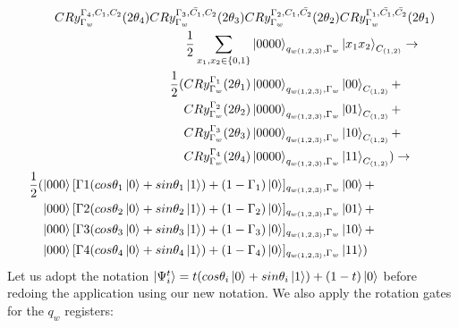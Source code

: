 \documentclass{article}
\begin{document}
\begin{equation}
    \begin{split}
        CRy_{\Gamma_w}^{\Gamma_4,C_1,C_2}(2\theta_4)CRy_{\Gamma_w}^{\Gamma_3,\bar{C_1},C_2}(2\theta_3)CRy_{\Gamma_w}^{\Gamma_2,C_1,\bar{C_2}}(2\theta_2)&CRy_{\Gamma_w}^{\Gamma_1,\bar{C_1},\bar{C_2}}(2\theta_1)\\
        \frac{1}{2}\sum_{x_1,x_2\in\{0,1\}}\ket{0000}_{q_{w(1,2,3)},\Gamma_w}&\ket{ x_1x_2}_{C_{(1,2)}}\to\\
        \frac{1}{2}(
        CRy_{\Gamma_w}^{\Gamma_1}(2\theta_1)\ket{0000}_{q_{w(1,2,3)},\Gamma_w}&\ket{ 00}_{C_{(1,2)}}+\\
        CRy_{\Gamma_w}^{\Gamma_2}(2\theta_2)\ket{0000}_{q_{w(1,2,3)},\Gamma_w}&\ket{ 01}_{C_{(1,2)}}+\\
        CRy_{\Gamma_w}^{\Gamma_3}(2\theta_3)\ket{0000}_{q_{w(1,2,3)},\Gamma_w}&\ket{ 10}_{C_{(1,2)}}+\\
        CRy_{\Gamma_w}^{\Gamma_4}(2\theta_4)\ket{0000}_{q_{w(1,2,3)},\Gamma_w}&\ket{ 11}_{C_{(1,2)}})\to\\
        \frac{1}{2}(
        \ket{000}[\Gamma1(cos\theta_1\ket{0}+sin\theta_1\ket{1})+(1-\Gamma_1)\ket{0}]_{q_{w(1,2,3)},\Gamma_w}&\ket{ 00}+\\
        \ket{000}[\Gamma2(cos\theta_2\ket{0}+sin\theta_2\ket{1})+(1-\Gamma_2)\ket{0}]_{q_{w(1,2,3)},\Gamma_w}&\ket{ 01}+\\
        \ket{000}[\Gamma3(cos\theta_3\ket{0}+sin\theta_3\ket{1})+(1-\Gamma_3)\ket{0}]_{q_{w(1,2,3)},\Gamma_w}&\ket{ 10}+\\
        \ket{000}[\Gamma4(cos\theta_4\ket{0}+sin\theta_4\ket{1})+(1-\Gamma_4)\ket{0}]_{q_{w(1,2,3)},\Gamma_w}&\ket{ 11}
        )
    \end{split}
\end{equation}
Let us adopt the notation $\ket{\Psi^t_i}=t(cos\theta_i\ket{0}+sin\theta_i\ket{1})+(1-t)\ket{0}$ before redoing the application using our new notation. We also apply the rotation gates for the $q_w$ registers:
\end{document}
